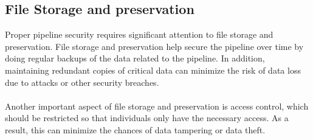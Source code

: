 \subsection{File Storage and preservation}
Proper pipeline security requires significant attention to file storage and preservation. File storage and preservation help secure the pipeline over time by doing regular backups of the data related to the pipeline. In addition, maintaining redundant copies of critical data can minimize the risk of data loss due to attacks or other security breaches. 
\\~\\
Another important aspect of file storage and preservation is access control, which should be restricted so that individuals only have the necessary access. As a result, this can minimize the chances of data tampering or data theft.

